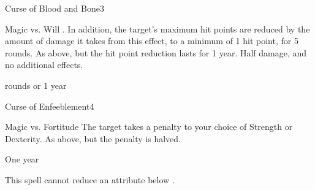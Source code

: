 \begin{spellsection}{Curse of Blood and Bone}{3}
\begin{spellheader}
\end{spellheader}
\begin{spellcontent}
    \begin{spelltargetinginfo}
    \end{spelltargetinginfo}
    \begin{spelleffects}
        \begin{spellattack}{Magic vs. Will}
            \spellsuccess {}. In addition, the target's maximum hit points are reduced by the amount of damage it takes from this effect, to a minimum of 1 hit point, for 5 rounds.
            \spellcritical As above, but the hit point reduction lasts for 1 year.
            \spellfailure Half damage, and no additional effects.
        \end{spellattack}
         rounds or 1 year
    \end{spelleffects}
\end{spellcontent}
\begin{spellfooter}
    \spellnotes \cursespellnotes
\end{spellfooter}
\end{spellsection}

\begin{spellsection}{Curse of Enfeeblement}{4}
\begin{spellheader}
\end{spellheader}
\begin{spellcontent}
    \begin{spelltargetinginfo}
    \end{spelltargetinginfo}
    \begin{spelleffects}
        \begin{spellattack}{Magic vs. Fortitude}
            \spellsuccess The target takes a  penalty to your choice of Strength or Dexterity.
            \spellfailure As above, but the penalty is halved.
        \end{spellattack}
        \spelldur One year
    \end{spelleffects}
\end{spellcontent}
\begin{spellfooter}
    \spellnotes This spell cannot reduce an attribute below . \cursespellnotes
\end{spellfooter}
\end{spellsection}

